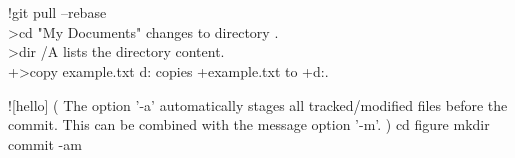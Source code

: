 \\
\\
\tcbinlinebashbox!{git pull --rebase}\\
\commandbox>{cd "My Documents"} changes to directory .\\
\commandbox*>{dir /A} lists the directory content.\\
\commandbox*+>{copy example.txt d:\target} copies \commandbox*+{example.txt} to \commandbox+{d:\target}.
\begin{tcbbashbox}![hello]%
(
    The option '-a' automatically stages all tracked/modified files before the commit.
    This can be combined with the message option '-m'.
)
    cd figure
    mkdir commit -am
\end{tcbbashbox}
